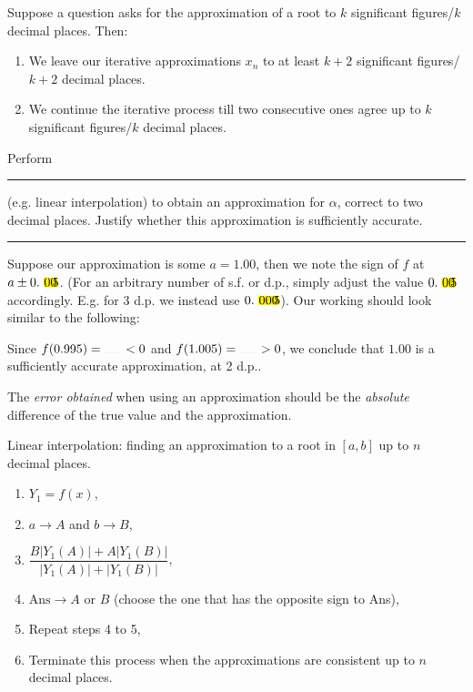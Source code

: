 \documentclass[../Notes.tex]{subfiles}
\begin{document}
\begin{note}
    Suppose a question asks for the approximation of a root to \(k\) significant figures/\(k\) decimal places. Then: 
    \begin{enumerate}
        \item We leave our iterative approximations \(x_n\) to at least \(k+2\) significant figures/\(k+2\) decimal places.
        \item We continue the iterative process till two consecutive ones agree up to \(k\) significant figures/\(k\) decimal places.
    \end{enumerate}
\end{note}
\begin{note}
    Perform \rule{1.5cm}{0.01mm} (e.g. linear interpolation) to obtain an approximation for \(\alpha\), correct to two decimal places. Justify whether this approximation is sufficiently accurate.

    \rule{20cm-137.0549pt}{0.05mm}

    Suppose our approximation is some \(a=1.00\), then we note the sign of \(f\) at \(a\pm 0.\highlight[yellow]{00}5\). (For an arbitrary number of s.f. or d.p., simply adjust the value \(0.\highlight[yellow]{00}5\) accordingly. E.g. for 3 d.p. we instead use \(0.\highlight[yellow]{000}5\)). Our working should look similar to the following:
    \begin{center}
        \parbox{0.9\textwidth}{
            Since \(f(0.995)=\rule{0.5cm}{0.01mm}<0\) and \(f(1.005)=\rule{0.5cm}{0.01mm}>0\), we conclude that \(1.00\) is a sufficiently accurate approximation, at 2 d.p..
        }
    \end{center}
\end{note}
\begin{note}
    The \emph{error obtained} when using an approximation should be the \emph{absolute} difference of the true value and the approximation. 
\end{note}
\begin{GCSkills}{}
    Linear interpolation: finding an approximation to a root in \([a,b]\) up to \(n\) decimal places.
    \begin{enumerate}
        \item \(Y_1=f(x)\),
        \item \(a \to A\) and \(b \to B\),
        \item \(\dfrac{B \lvert Y_1(A) \rvert+A \lvert Y_1(B) \rvert}{\lvert Y_1(A) \rvert+\lvert Y_1(B) \rvert}\),
        \item \(\text{Ans}\to A \text{ or } B\) (choose the one that has the opposite sign to Ans),
        \item Repeat steps 4 to 5,
        \item Terminate this process when the approximations are consistent up to \(n\) decimal places.
    \end{enumerate}
    \end{GCSkills}
\end{document}
